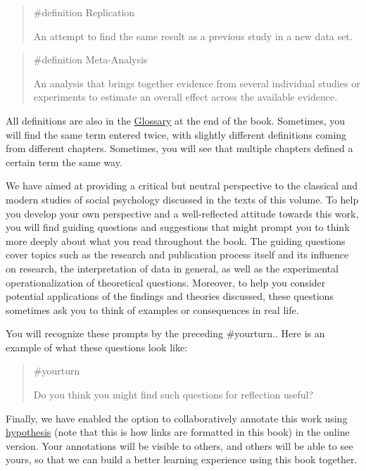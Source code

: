 \documentclass[
  letterpaper,
]{book}
\begin{document}
\begin{quote}
\label{def-replication}{\#definition} Replication

An attempt to find the same result as a previous study in a new data
set.
\end{quote}

\begin{quote}
\label{def-metaanalysis}{\#definition} Meta-Analysis

An analysis that brings together evidence from several individual
studies or experiments to estimate an overall effect across the
available evidence.
\end{quote}

All definitions are also in the \href{glossary.qmd}{Glossary} at the end
of the book. Sometimes, you will find the same term entered twice, with
slightly different definitions coming from different chapters.
Sometimes, you will see that multiple chapters defined a certain term
the same way.

We have aimed at providing a critical but neutral perspective to the
classical and modern studies of social psychology discussed in the texts
of this volume. To help you develop your own perspective and a
well-reflected attitude towards this work, you will find guiding
questions and suggestions that might prompt you to think more deeply
about what you read throughout the book. The guiding questions cover
topics such as the research and publication process itself and its
influence on research, the interpretation of data in general, as well as
the experimental operationalization of theoretical questions. Moreover,
to help you consider potential applications of the findings and theories
discussed, these questions sometimes ask you to think of examples or
consequences in real life.

You will recognize these prompts by the preceding {\#yourturn.}. Here is
an example of what these questions look like:

\begin{quote}
{\#yourturn}

Do you think you might find such questions for reflection useful?
\end{quote}

Finally, we have enabled the option to collaboratively annotate this
work using \href{https://web.hypothes.is/}{hypothesis} (note that this
is how links are formatted in this book) in the online version. Your
annotations will be visible to others, and others will be able to see
yours, so that we can build a better learning experience using this book
together.
\end{document}
